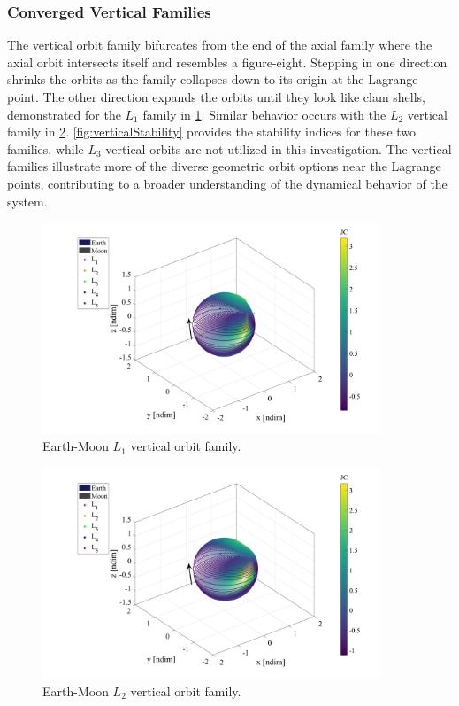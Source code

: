 \subsubsection{Converged Vertical Families}
The vertical orbit family bifurcates from the end of the axial family where the axial orbit
intersects itself and resembles a figure-eight. Stepping in one direction shrinks the orbits as the
family collapses down to its origin at the Lagrange point. The other direction expands the orbits
until they look like clam shells, demonstrated for the $L_{1}$ family in \cref{fig:L1Vertical}.
Similar behavior occurs with the $L_{2}$ vertical family in \cref{fig:L2Vertical}.
\cref{fig:verticalStability} provides the stability indices for these two families, while $L_{3}$
vertical orbits are not utilized in this investigation. The vertical families illustrate more of
the diverse geometric orbit options near the Lagrange points, contributing to a broader
understanding of the dynamical behavior of the system.
\vspace{35mm}

\begin{figure}[H]
    \centering
    \includegraphics[width=0.9\textwidth]{figures/L1VerticalFamily.pdf}
    \caption{Earth-Moon $L_{1}$ vertical orbit family.}
    \label{fig:L1Vertical}
\end{figure}

\begin{figure}[H]
    \centering
    \includegraphics[width=0.9\textwidth]{figures/L2VerticalFamily.pdf}
    \caption{Earth-Moon $L_{2}$ vertical orbit family.}
    \label{fig:L2Vertical}
\end{figure}

